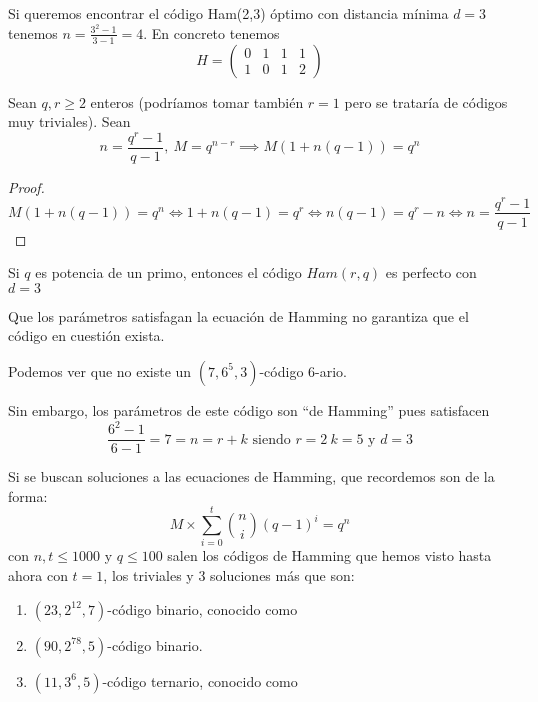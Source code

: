\begin{example}
Si queremos encontrar el código Ham(2,3) óptimo con distancia mínima $d=3$ tenemos $n=\frac{3^2-1}{3-1}=4$. En concreto tenemos
\[H=\left( \begin{array}{cccc}
0 & 1 & 1 & 1 \\
1 & 0 & 1 & 2
\end{array}\right)\]
\end{example}

\begin{prop}
Sean $q,r \geq 2$ enteros (podríamos tomar también $r=1$ pero se trataría de códigos muy triviales). Sean
\[n = \frac{q^r-1}{q-1}, \ M=q^{n-r} \implies M(1+n(q-1))=q^n\]
\end{prop}
\begin{proof}
\[M(1+n(q-1))=q^n \iff 1+n(q-1) = q^r \iff n(q-1)=q^r-n \iff n=\frac{q^r-1}{q-1}\]
\end{proof}

\begin{corol}
Si $q$ es potencia de un primo, entonces el código $Ham(r,q)$ es perfecto con $d=3$
\end{corol}

\obs Que los parámetros satisfagan la ecuación de Hamming no garantiza que el código en cuestión exista.

\begin{example}
Podemos ver que no existe un $(7,6^5,3)$-código 6-ario.

Sin embargo, los parámetros de este código son ``de Hamming'' pues satisfacen
\[\frac{6^2-1}{6-1}=7=n=r+k \text{ siendo } r=2 \ k=5 \text{ y } d=3\]

\end{example}

Si se buscan soluciones a las ecuaciones de Hamming, que recordemos son de la forma:
\[M \times \sum_{i=0}^t {n \choose i} (q-1)^i=q^n\]
con $n,t \leq 1000$ y $q \leq 100$ salen los códigos de Hamming que hemos visto hasta ahora con $t=1$, los triviales y 3 soluciones más que son:

\begin{enumerate}
\item $(23,2^{12},7)$-código binario, conocido como 
\item $(90,2^{78},5)$-código binario.
\item $(11,3^6,5)$-código ternario, conocido como 
\end{enumerate}

